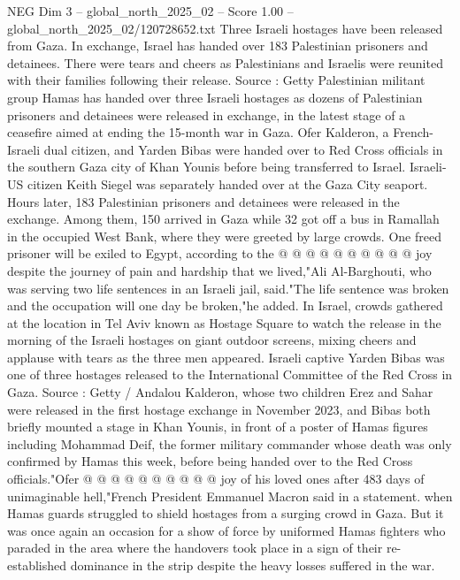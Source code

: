 \begin{textsample}{NEG Dim 3 – global\_north\_2025\_02 – Score 1.00 – global\_north\_2025\_02/120728652.txt}  \label{ex:f3_neg_174}
Three Israeli hostages have been released from Gaza.
In exchange, Israel has handed over 183 Palestinian prisoners and detainees.
There were tears and cheers as Palestinians and Israelis were reunited with their families following their release.
Source : Getty Palestinian militant group Hamas has handed over three Israeli hostages as dozens of Palestinian prisoners and detainees were released in exchange, in the latest stage of a ceasefire aimed at ending the 15-month war in Gaza.
Ofer Kalderon, a French-Israeli dual citizen, and Yarden Bibas were handed over to Red Cross officials in the southern Gaza city of Khan Younis before being transferred to Israel.
Israeli-US citizen Keith Siegel was separately handed over at the Gaza City seaport.
Hours later, 183 Palestinian prisoners and detainees were released in the exchange.
Among them, 150 arrived in Gaza while 32 got off a bus in Ramallah in the occupied West Bank, where they were greeted by large crowds.
One freed prisoner will be exiled to Egypt, according to the @ @ @ @ @ @ @ @ @ @ joy despite the journey of pain and hardship that we lived,"Ali Al-Barghouti, who was serving two life sentences in an Israeli jail, said."The life sentence was broken and the occupation will one day be broken,"he added.
In Israel, crowds gathered at the location in Tel Aviv known as Hostage Square to watch the release in the morning of the Israeli hostages on giant outdoor screens, mixing cheers and applause with tears as the three men appeared.
Israeli captive Yarden Bibas was one of three hostages released to the International Committee of the Red Cross in Gaza.
Source : Getty / Andalou Kalderon, whose two children Erez and Sahar were released in the first hostage exchange in November 2023, and Bibas both briefly mounted a stage in Khan Younis, in front of a poster of Hamas figures including Mohammad Deif, the former military commander whose death was only confirmed by Hamas this week, before being handed over to the Red Cross officials."Ofer @ @ @ @ @ @ @ @ @ @ joy of his loved ones after 483 days of unimaginable hell,"French President Emmanuel Macron said in a statement. when Hamas guards struggled to shield hostages from a surging crowd in Gaza.
But it was once again an occasion for a show of force by uniformed Hamas fighters who paraded in the area where the handovers took place in a sign of their re-established dominance in the strip despite the heavy losses suffered in the war.

\end{textsample}
